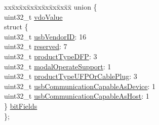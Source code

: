 \begin{DoxyCompactItemize}
\begin{tabbing}
\end{tabbing}\item 
\begin{tabbing}
xx\=xx\=xx\=xx\=xx\=xx\=xx\=xx\=xx\=\kill
union \{\\
\>uint32\_t \hyperlink{struct__pd__id__heaer__vdo_ab1f86734d25b3b0135b97b567dbbf827}{vdoValue}\\
\>struct \{\\
\>\>uint32\_t \hyperlink{struct__pd__id__heaer__vdo_ac60e1351de454f4102ab80718eed2c67}{usbVendorID}: 16\\
\>\>uint32\_t \hyperlink{struct__pd__id__heaer__vdo_a43740bc954203ec44d1ca7bd2855b6c3}{reserved}: 7\\
\>\>uint32\_t \hyperlink{struct__pd__id__heaer__vdo_aef462ffc653ad2c2633fd6bff1eadb0a}{productTypeDFP}: 3\\
\>\>uint32\_t \hyperlink{struct__pd__id__heaer__vdo_a05bbc0945df5f73e31fd61813c47333d}{modalOperateSupport}: 1\\
\>\>uint32\_t \hyperlink{struct__pd__id__heaer__vdo_a20e16d999c9ca067508530a798a97700}{productTypeUFPOrCablePlug}: 3\\
\>\>uint32\_t \hyperlink{struct__pd__id__heaer__vdo_ad331325dfcf70a48ea3511868148af2f}{usbCommunicationCapableAsDevice}: 1\\
\>\>uint32\_t \hyperlink{struct__pd__id__heaer__vdo_a205f468c3e9ddb3895ffcf9b94ab3659}{usbCommunicationCapableAsHost}: 1\\
\>\} \hyperlink{struct__pd__id__heaer__vdo_a02ec90b2ccbc57d35919c83fe538958d}{bitFields}\\
\}; \\


\end{tabbing}
\end{DoxyCompactItemize}
